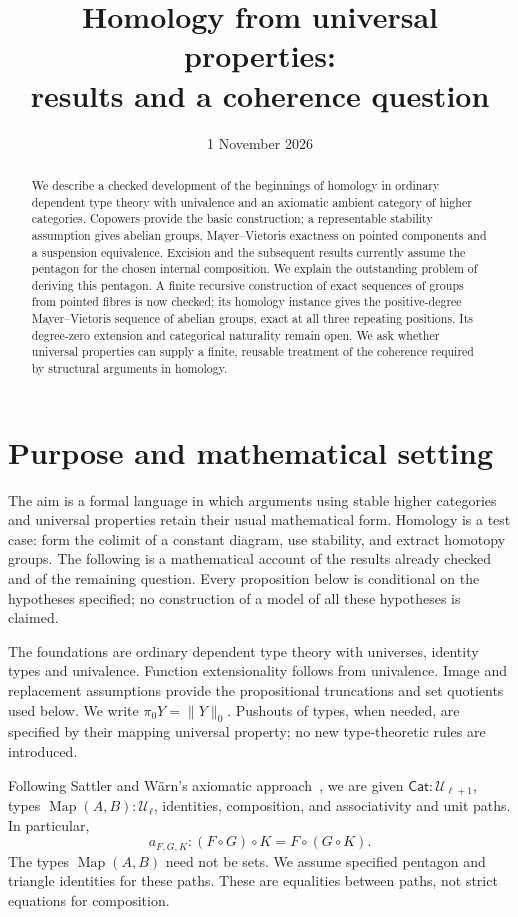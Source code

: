 \documentclass[11pt,a4paper]{amsart}
\title[Homology and coherence]{Homology from universal properties:\\
 results and a coherence question}
\date{1 November 2026}
\theoremstyle{definition}
\newcommand{\Cat}{\mathsf{Cat}}
\newcommand{\Map}{\operatorname{Map}}
\newcommand{\U}{\mathcal U}
\begin{document}
\begin{abstract}
We describe a checked development of the beginnings of homology in
ordinary dependent type theory with univalence and an axiomatic ambient
category of higher categories. Copowers provide the basic construction;
a representable stability assumption gives abelian groups,
Mayer--Vietoris exactness on pointed components and a suspension equivalence. Excision and the
subsequent results currently assume the pentagon for the chosen internal
composition. We explain the outstanding problem of deriving this
pentagon. A finite recursive construction of exact sequences of groups
from pointed fibres is now checked; its homology instance gives the
positive-degree Mayer--Vietoris sequence of abelian groups, exact at
all three repeating positions. Its degree-zero extension and
categorical naturality remain open.
We ask whether universal properties can supply a finite,
reusable treatment of the coherence required by structural arguments in
homology.
\end{abstract}
\maketitle

\section{Purpose and mathematical setting}

The aim is a formal language in which arguments using stable higher
categories and universal properties retain their usual mathematical
form. Homology is a test case: form the colimit of a constant diagram,
use stability, and extract homotopy groups. The following is a
mathematical account of the results already checked and of the remaining
question. Every proposition below is conditional on the hypotheses
specified; no construction of a model of all these hypotheses is claimed.

The foundations are ordinary dependent type theory with universes,
identity types and univalence. Function extensionality follows from
univalence. Image and replacement assumptions provide the propositional
truncations and set quotients used below. We write $\pi_0Y=\|Y\|_0$.
Pushouts of types, when needed, are specified by their mapping universal
property; no new type-theoretic rules are introduced.

Following Sattler and W\"arn's axiomatic approach~\cite{SW}, we are given
$\Cat:\U_{\ell+1}$, types $\Map(A,B):\U_\ell$, identities, composition,
and associativity and unit paths. In particular,
\[
 a_{F,G,K}:(F\circ G)\circ K=F\circ(G\circ K).
\]
The types $\Map(A,B)$ need not be sets. We assume specified pentagon and
triangle identities for these paths. These are equalities between paths,
not strict equations for composition.
\end{document}
